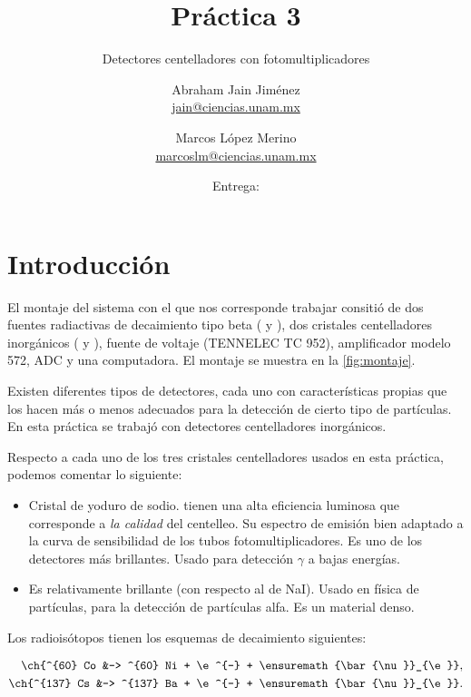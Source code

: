 \documentclass[12pt]{article}
\title{Práctica 3}
\subtitle{Detectores centelladores con fotomultiplicadores}
\author{%
    Abraham Jain Jiménez \\ \href{mailto:jain@ciencias.unam.mx}{\footnotesize jain@ciencias.unam.mx}
  \and Marcos López Merino \\ \href{mailto:marcoslm@ciencias.unam.mx}{\footnotesize marcoslm@ciencias.unam.mx}
}%
\date{Entrega: \DTMusedate{duedate}}
\begin{document}
    \maketitle
    \thispagestyle{fancy}
    \begin{abstract}
        \kant[1]
    \end{abstract}

    \section*{Introducción}
        El montaje del sistema con el que nos corresponde trabajar consitió de dos fuentes radiactivas de decaimiento tipo beta ( y ), dos cristales centelladores inorgánicos ( y ), fuente de voltaje (TENNELEC TC 952), amplificador modelo 572\cite{Amplifier572}, ADC\cite{USC30ADC} y una computadora. El montaje se muestra en la \cref{fig:montaje}.

        Existen diferentes tipos de detectores, cada uno con características propias que los hacen más o menos adecuados para la detección de cierto tipo de partículas. En esta práctica se trabajó con detectores centelladores inorgánicos.

        Respecto a cada uno de los tres cristales centelladores usados en esta práctica, podemos comentar lo siguiente:

        \begin{itemize}
            \item {}

            Cristal de yoduro de sodio. tienen una alta eficiencia luminosa que corresponde a \emph{la calidad} del centelleo. Su espectro de emisión bien adaptado a la curva de sensibilidad de los tubos fotomultiplicadores. Es uno de los detectores más brillantes. Usado para detección $\gamma$ a bajas energías.

            \item {}

            Es relativamente brillante (con respecto al de NaI). Usado en física de partículas, para la detección de partículas alfa. Es un material denso. 
        \end{itemize}

        Los radioisótopos tienen los esquemas de decaimiento siguientes:

        \begin{align*}
            \ch{^{60} Co &-> ^{60} Ni + \e^{-} + \ensuremath{\bar{\nu}}_{\e}},\\
            \ch{^{137} Cs &-> ^{137} Ba + \e^{-} + \ensuremath{\bar{\nu}}_{\e}}.
        \end{align*}
    
\end{document}
